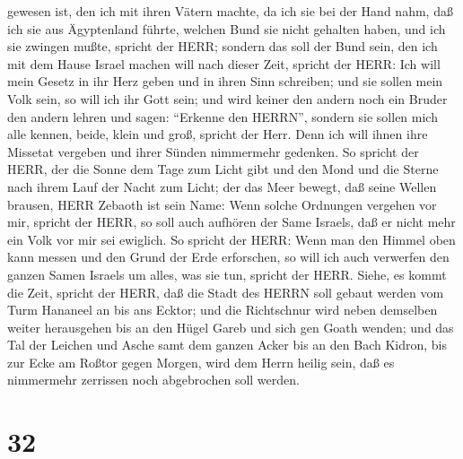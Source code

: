 gewesen ist, den ich mit ihren Vätern machte, da ich sie bei der Hand
nahm, daß ich sie aus Ägyptenland führte, welchen Bund sie nicht
gehalten haben, und ich sie zwingen mußte, spricht der HERR;
 sondern das soll der Bund sein, den ich mit dem Hause
Israel machen will nach dieser Zeit, spricht der HERR: Ich will mein
Gesetz in ihr Herz geben und in ihren Sinn schreiben; und sie sollen
mein Volk sein, so will ich ihr Gott sein;  und wird keiner
den andern noch ein Bruder den andern lehren und sagen: ``Erkenne den
HERRN'', sondern sie sollen mich alle kennen, beide, klein und groß,
spricht der Herr. Denn ich will ihnen ihre Missetat vergeben und ihrer
Sünden nimmermehr gedenken.  So spricht der HERR, der die
Sonne dem Tage zum Licht gibt und den Mond und die Sterne nach ihrem
Lauf der Nacht zum Licht; der das Meer bewegt, daß seine Wellen brausen,
HERR Zebaoth ist sein Name:  Wenn solche Ordnungen vergehen
vor mir, spricht der HERR, so soll auch aufhören der Same Israels, daß
er nicht mehr ein Volk vor mir sei ewiglich.  So spricht
der HERR: Wenn man den Himmel oben kann messen und den Grund der Erde
erforschen, so will ich auch verwerfen den ganzen Samen Israels um
alles, was sie tun, spricht der HERR.  Siehe, es kommt die
Zeit, spricht der HERR, daß die Stadt des HERRN soll gebaut werden vom
Turm Hananeel an bis ans Ecktor;  und die Richtschnur wird
neben demselben weiter herausgehen bis an den Hügel Gareb und sich gen
Goath wenden;  und das Tal der Leichen und Asche samt dem
ganzen Acker bis an den Bach Kidron, bis zur Ecke am Roßtor gegen
Morgen, wird dem Herrn heilig sein, daß es nimmermehr zerrissen noch
abgebrochen soll werden.

\hypertarget{section-31}{%
\section{32}\label{section-31}}

